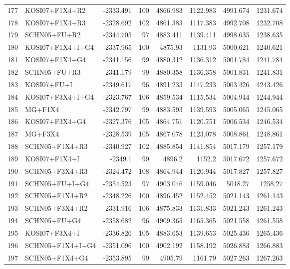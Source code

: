 \documentclass[12pt]{article}
\begin{document}
\begin{longtable}{clrrrrrr}
	177 & KOSI07+F1X4+R2 & -2333.491 & 100 & 4866.983 & 1122.983 & 4991.674 & 1231.674 \\ 
	178 & KOSI07+F1X4+R3 & -2328.692 & 102 & 4861.383 & 1117.383 & 4992.708 & 1232.708 \\ 
	179 & SCHN05+FU+R2 & -2344.705 & 97 & 4883.411 & 1139.411 & 4998.635 & 1238.635 \\ 
	180 & KOSI07+F1X4+I+G4 & -2337.965 & 100 & 4875.93 & 1131.93 & 5000.621 & 1240.621 \\ 
	181 & KOSI07+F1X4+G4 & -2341.156 & 99 & 4880.312 & 1136.312 & 5001.784 & 1241.784 \\ 
	182 & SCHN05+FU+R3 & -2341.179 & 99 & 4880.358 & 1136.358 & 5001.831 & 1241.831 \\ 
	183 & KOSI07+FU+I & -2349.617 & 96 & 4891.233 & 1147.233 & 5003.426 & 1243.426 \\ 
	184 & KOSI07+F3X4+I+G4 & -2323.767 & 106 & 4859.534 & 1115.534 & 5004.944 & 1244.944 \\ 
	185 & MG+F1X4 & -2342.797 & 99 & 4883.593 & 1139.593 & 5005.065 & 1245.065 \\ 
	186 & KOSI07+F3X4+G4 & -2327.376 & 105 & 4864.751 & 1120.751 & 5006.534 & 1246.534 \\ 
	187 & MG+F3X4 & -2328.539 & 105 & 4867.078 & 1123.078 & 5008.861 & 1248.861 \\ 
	188 & SCHN05+F1X4+R3 & -2340.927 & 102 & 4885.854 & 1141.854 & 5017.179 & 1257.179 \\ 
	189 & KOSI07+F1X4+I & -2349.1 & 99 & 4896.2 & 1152.2 & 5017.672 & 1257.672 \\ 
	190 & SCHN05+F3X4+R3 & -2324.472 & 108 & 4864.944 & 1120.944 & 5017.827 & 1257.827 \\ 
	191 & SCHN05+FU+I+G4 & -2354.523 & 97 & 4903.046 & 1159.046 & 5018.27 & 1258.27 \\ 
	192 & SCHN05+F1X4+R2 & -2348.226 & 100 & 4896.452 & 1152.452 & 5021.143 & 1261.143 \\ 
	193 & SCHN05+F3X4+R2 & -2331.916 & 106 & 4875.833 & 1131.833 & 5021.243 & 1261.243 \\ 
	194 & SCHN05+FU+G4 & -2358.682 & 96 & 4909.365 & 1165.365 & 5021.558 & 1261.558 \\ 
	195 & KOSI07+F3X4+I & -2336.826 & 105 & 4883.653 & 1139.653 & 5025.436 & 1265.436 \\ 
	196 & SCHN05+F1X4+I+G4 & -2351.096 & 100 & 4902.192 & 1158.192 & 5026.883 & 1266.883 \\ 
	197 & SCHN05+F1X4+G4 & -2353.895 & 99 & 4905.79 & 1161.79 & 5027.263 & 1267.263 \\ 

\end{longtable}
\end{document}
